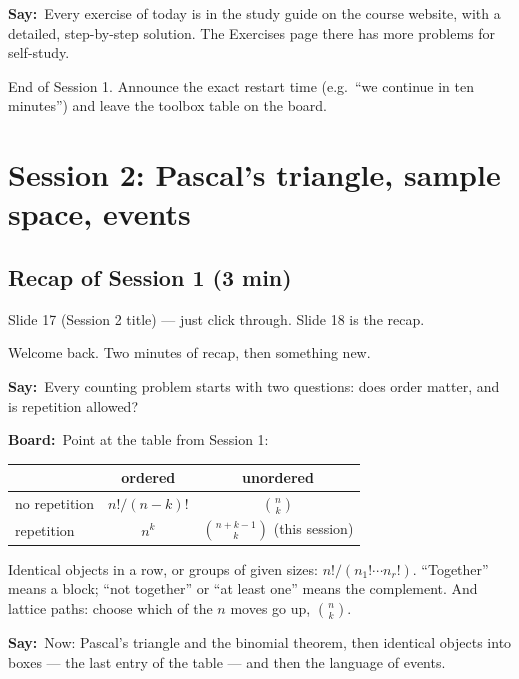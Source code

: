 \documentclass[11pt,a4paper,parskip=half]{scrartcl}
\newcommand{\say}{\textbf{\color{teal}Say:}\ }
\newcommand{\board}{\textbf{\color{gold}Board:}\ }
\newcommand{\slide}[1]{\marginpar{\raggedright\footnotesize\color{gray}slide #1}}
\begin{document}
\say Every exercise of today is in the study guide on the course website,
with a detailed, step-by-step solution. The Exercises page there has more
problems for self-study.

\begin{cue}
	End of Session 1. Announce the exact restart time (e.g.\ ``we continue in
	ten minutes'') and leave the toolbox table on the board.
\end{cue}

\section{Session 2: Pascal's triangle, sample space, events}

\subsection{Recap of Session 1 (3 min)}\slide{17--18}

\begin{cue}
	Slide 17 (Session 2 title) --- just click through. Slide 18 is the recap.
\end{cue}

Welcome back. Two minutes of recap, then something new.

\say Every counting problem starts with two questions: does order matter, and
is repetition allowed?

\board Point at the table from Session 1:
\begin{center}
	\begin{tabular}{lcc}\toprule
		              & ordered     & unordered                         \\\midrule
		no repetition & $n!/(n-k)!$ & $\binom nk$                       \\
		repetition    & $n^k$       & $\binom{n+k-1}{k}$ (this session) \\\bottomrule
	\end{tabular}
\end{center}

Identical objects in a row, or groups of given sizes:
$n!/(n_1!\cdots n_r!)$. ``Together'' means a block; ``not together'' or ``at
least one'' means the complement. And lattice paths: choose which of the $n$
moves go up, $\binom nk$.

\say Now: Pascal's triangle and the binomial theorem, then identical objects
into boxes --- the last entry of the table --- and then the language of
events.
\end{document}
